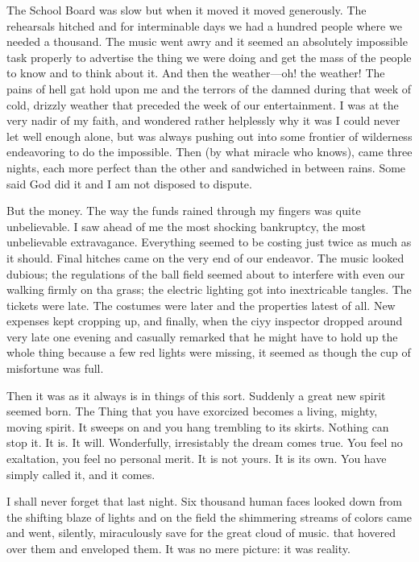 \documentclass[letterpaper,10pt,english]{jupyterBook}
\begin{document}
\sphinxAtStartPar
The School Board was slow but when it moved it moved generously. The rehearsals hitched and for interminable days we had a hundred people where we needed a thousand. The music went awry and it seemed an absolutely impossible task properly to advertise the thing we were doing and get the mass of the people to know and to think about it. And then the weather—oh! the weather! The pains of hell gat hold upon me and the terrors of the damned during that week of cold, drizzly weather that preceded the week of our entertainment. I was at the very nadir of my faith, and wondered rather helplessly why it was I could never let well enough alone, but was always pushing out into some frontier of wilderness endeavoring to do the impossible. Then (by what miracle who knows), came three nights, each more perfect than the other and sandwiched in between rains. Some said God did it and I am not disposed to dispute.

\sphinxAtStartPar
But the money. The way the funds rained through my fingers was quite unbelievable. I saw ahead of me the most shocking bankruptcy, the most unbelievable extravagance. Everything seemed to be costing just twice as much as it should. Final hitches came on the very end of our endeavor. The music looked dubious; the regulations of the ball field seemed about to interfere with even our walking firmly on tha grass; the electric lighting got into inextricable tangles. The tickets were late. The costumes were later and the properties latest of all. New expenses kept cropping up, and finally, when the ciyy inspector dropped around very late one evening and casually remarked that he might have to hold up the whole thing because a few red lights were missing, it seemed as though the cup of misfortune was full.

\sphinxAtStartPar
Then it was as it always is in things of this sort. Suddenly a great new spirit seemed born. The Thing that you have exorcized becomes a living, mighty, moving spirit. It sweeps on and you hang trembling to its skirts. Nothing can stop it. It is. It will. Wonderfully, irresistably the dream comes true. You feel no exaltation, you feel no personal merit. It is not yours. It is its own. You have simply called it, and it comes.

\sphinxAtStartPar
I shall never forget that last night. Six thousand human faces looked down from the shifting blaze of lights and on the field the shimmering streams of colors came and went, silently, miraculously save for the great cloud of music. that hovered over them and enveloped them. It was no mere picture: it was reality.
\end{document}
